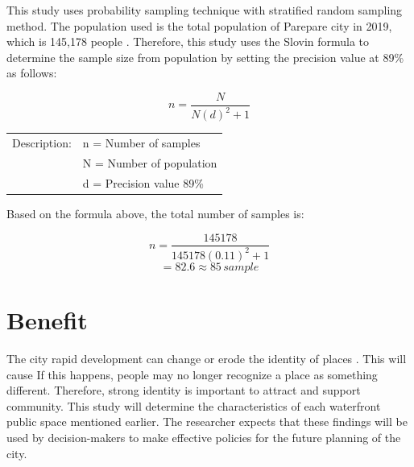 \documentclass[draft, ../riset_senja.tex]{subfiles}
\begin{document}
This study uses probability sampling technique with stratified random sampling method. The population used is the total population of Parepare city in 2019, which is 145,178 people \citep{bps2020}.
Therefore, this study uses the Slovin formula to determine the sample size from population by setting the precision value at 89\% as follows:

$$ n= \frac{N}{N(d)^2+1} $$

\begin{tabular}{ll}
	\small
	Description: & n = Number of samples     \\
	             & N = Number of  population \\
	             & d = Precision value 89\%  \\
\end{tabular}

Based on the formula above, the total number of samples is:

$$ n= \frac{145178}{145178(0.11)^2+1} $$
$$ = 82.6 \approx  85\, sample $$


\section{Benefit}%
\label{sec:Benefit}

The city rapid development can change or erode the identity of places \citep{hartanti2012}. This will cause
If this happens, people may no longer recognize a place as something different. Therefore, strong identity is important to attract and support community.
This study will determine the characteristics of each waterfront public space mentioned earlier. The researcher expects that these findings will be used by decision-makers to make effective policies for the future planning of the city.



\end{document}
